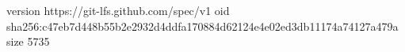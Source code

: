 version https://git-lfs.github.com/spec/v1
oid sha256:c47eb7d448b55b2e2932d4ddfa170884d62124e4e02ed3db11174a74127a479a
size 5735
